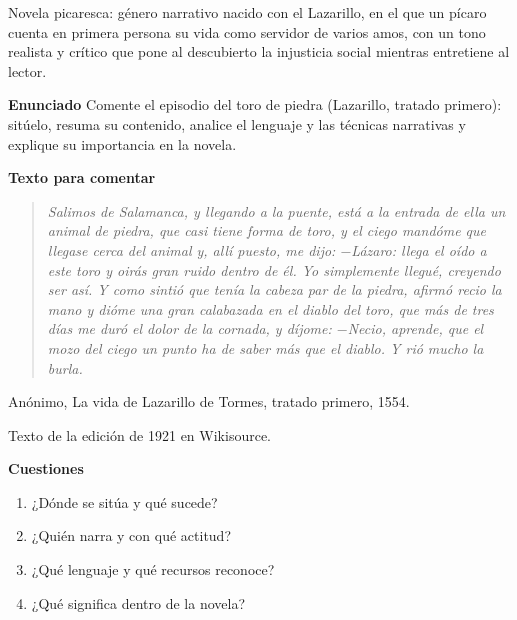 \documentclass{book}
\begin{document}
\begin{tcolorbox}[title={Definición}, studiumdef, breakable]

Novela picaresca: género narrativo nacido con el Lazarillo, en el que un pícaro cuenta en primera persona su vida como servidor de varios amos, con un tono realista y crítico que pone al descubierto la injusticia social mientras entretiene al lector.

\end{tcolorbox}

\begin{tcolorbox}[title={Ejercicio resuelto}, studiumworked, breakable]

\noindent\textbf{Enunciado}
Comente el episodio del toro de piedra (Lazarillo, tratado primero): sitúelo, resuma su contenido, analice el lenguaje y las técnicas narrativas y explique su importancia en la novela.


\noindent\textbf{Texto para comentar}

\begin{quote}
\itshape Salimos de Salamanca, y llegando a la puente, está a la entrada de ella un animal de piedra, que casi tiene forma de toro, y el ciego mandóme que llegase cerca del animal y, allí puesto, me dijo: \(-\)Lázaro: llega el oído a este toro y oirás gran ruido dentro de él. Yo simplemente llegué, creyendo ser así. Y como sintió que tenía la cabeza par de la piedra, afirmó recio la mano y dióme una gran calabazada en el diablo del toro, que más de tres días me duró el dolor de la cornada, y díjome: \(-\)Necio, aprende, que el mozo del ciego un punto ha de saber más que el diablo. Y rió mucho la burla.
\end{quote}
{\noindent\footnotesize Anónimo, La vida de Lazarillo de Tormes, tratado primero, 1554.\par}
{\noindent\footnotesize Texto de la edición de 1921 en Wikisource.\par}

\noindent\textbf{Cuestiones}
\begin{enumerate}
\item ¿Dónde se sitúa y qué sucede?
\item ¿Quién narra y con qué actitud?
\item ¿Qué lenguaje y qué recursos reconoce?
\item ¿Qué significa dentro de la novela?
\end{enumerate}


\end{tcolorbox}
\end{document}
